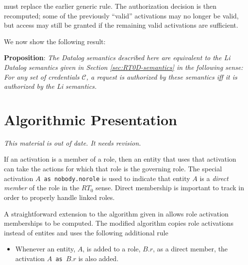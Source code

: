 \documentclass{article}
\newcommand{\newterm}[1]{\textit{#1}}
\newcommand{\activate}[2]{\texttt{#1 as #2}}
\begin{document}
must replace the earlier generic rule. The authorization decision is then recomputed; some of
the previously ``valid'' activations may no longer be valid, but access may still be granted if
the remaining valid activations are sufficient.

We now show the following result:

\textbf{Proposition}: \textit{The Datalog semantics described here are equivalent to the Li
  Datalog semantics given in Section \ref{sec:RT0D-semantics} in the following sense: For any
  set of credentials $\mathcal{C}$, a request is authorized by these semantics iff it is
  authorized by the Li semantics.}


\section{Algorithmic Presentation}

\textit{This material is out of date. It needs revision.}


If an activation is a member of a role, then an entity that uses that activation can take the
actions for which that role is the governing role. The special activation
\activate{$A$}{nobody.norole} is used to indicate that entity $A$ is a \newterm{direct member}
of the role in the $RT_0$ sense. Direct membership is important to track in order to properly
handle linked roles.

A straightforward extension to the algorithm given in \cite{Li:2003-02} allows role activation
memberships to be computed. The modified algorithm copies role activations instead of entites
and uses the following additional rule

\begin{itemize}

\item Whenever an entity, $A$, is added to a role, $B.r$, as a direct member, the activation
  \activate{$A$}{$B.r$} is also added.

\end{itemize}
\end{document}

